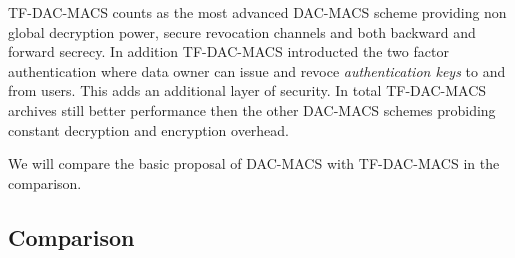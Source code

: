TF-DAC-MACS counts as the most advanced DAC-MACS scheme providing non global decryption power, secure revocation channels and both backward and forward secrecy. In addition TF-DAC-MACS introducted the two factor authentication where data owner can issue and revoce \textit{authentication keys} to and from users. This adds an additional layer of security. In total TF-DAC-MACS archives still better performance then the other DAC-MACS schemes probiding constant decryption and encryption overhead. 

We will compare the basic proposal of DAC-MACS with TF-DAC-MACS in the comparison. 

\subsection{Comparison}
\label{sec:ma-comparison}

